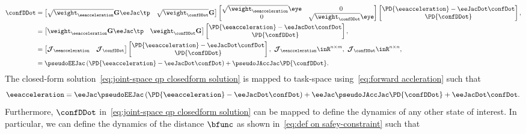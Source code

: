\begin{align}\label{eq:joint-space qp closedform solution}
	\begin{split}
			\confDDot &=  \begin{bmatrix}
			\sqrt{\weight_{\eeacceleration}}\mathbf{G} {\eeJac}\tp & \sqrt{\weight_{\confDDot}} \mathbf{G} 
		\end{bmatrix} 
		\begin{bmatrix}
			\sqrt{\weight_{\eeacceleration}}\eye & 0 \\ 0 & \sqrt{\weight_{\confDDot}}\eye
		\end{bmatrix}
		\begin{bmatrix}
			\PD{\eeacceleration} - \eeJacDot \confDot \\  \PD{\confDDot}
		\end{bmatrix}, \\
	&= \begin{bmatrix}
		\weight_{\eeacceleration} \mathbf{G}{\eeJac}\tp & \weight_{\confDDot} \mathbf{G} 
	\end{bmatrix}
		\begin{bmatrix}
			\PD{\eeacceleration} - \eeJacDot \confDot \\  \PD{\confDDot}
		\end{bmatrix},
	 \\ 
	&= \begin{bmatrix}
		\boldsymbol{\cal J}_{\eeacceleration} &  \boldsymbol{\cal J}_{\confDDot}
	\end{bmatrix}
	\begin{bmatrix}
		\PD{\eeacceleration} - \eeJacDot \confDot \\  \PD{\confDDot}
	\end{bmatrix}, \ \boldsymbol{\cal J}_{\eeacceleration}\inR^{n\times m}, \ \boldsymbol{\cal J}_{\confDDot}\inR^{n\times n},\\
	&= \pseudoEEJac\left(\PD{\eeacceleration} - \eeJacDot \confDot\right) + \pseudoJAccJac\PD{\confDDot}.
\end{split}
\end{align}
The closed-form solution~\eqref{eq:joint-space qp closedform solution} is mapped to task-space using~\cref{eq:forward accleration} such that 
\begin{equation}\label{eq:task-space qp closedform solution}
	\eeacceleration = \eeJac\pseudoEEJac\left(\PD{\eeacceleration} - \eeJacDot \confDot\right) + \eeJac\pseudoJAccJac\PD{\confDDot} + \eeJacDot\confDot.
\end{equation}
Furthermore, $\confDDot$ in~\cref{eq:joint-space qp closedform solution} can be mapped to define the dynamics of any other state of interest. In particular, we can define the  dynamics of the distance $\bfunc$ as shown in~\cref{eq:def on safey-constraint} such that%
